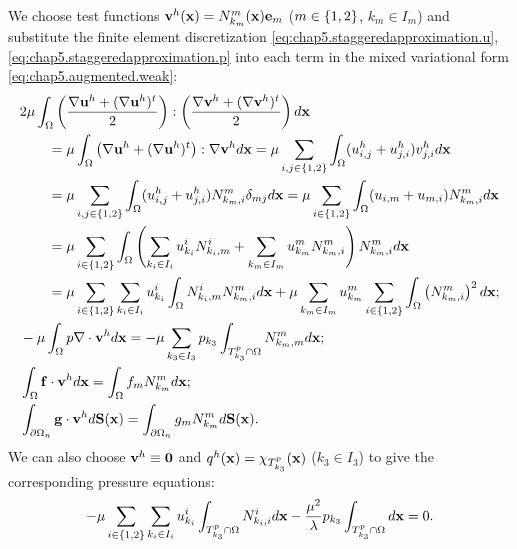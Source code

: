 We choose test functions $\mathbf{v}^h(\mathbf{x}) = N^m_{k_m}(\mathbf{x}) \mathbf{e}_m$ ($m \in \left\lbrace 1,2 \right\rbrace$, $k_m \in I_m$) and substitute the finite element discretization \eqref{eq:chap5.staggeredapproximation.u}, \eqref{eq:chap5.staggeredapproximation.p} into each term in the mixed variational form \eqref{eq:chap5.augmented.weak}:
\begin{subequations} \label{eq:chap5.integrations}
\begin{align}
& 2 \mu \int_{\Omega} \left( \frac{\nabla \mathbf{u}^h + (\nabla \mathbf{u}^h)^t}{2} \right) : \left( \frac{\nabla \mathbf{v}^h + (\nabla \mathbf{v}^h)^t}{2} \right) d\mathbf{x} \\
& \qquad = \mu \int_{\Omega} \left( \nabla \mathbf{u}^h + (\nabla \mathbf{u}^h)^t \right) : \nabla \mathbf{v}^h d\mathbf{x} = \mu \sum_{i,j \in \left\lbrace 1,2 \right\rbrace} \int_{\Omega} (u^h_{i,j} + u^h_{j,i}) v^h_{j,i} d\mathbf{x} \\
& \qquad = \mu \sum_{i,j \in \left\lbrace 1,2 \right\rbrace} \int_{\Omega} (u^h_{i,j} + u^h_{j,i}) N^m_{k_m,i} \delta_{mj} d\mathbf{x} = \mu \sum_{i \in \left\lbrace 1,2 \right\rbrace} \int_{\Omega} (u_{i,m}+u_{m,i}) N^m_{k_m,i} d\mathbf{x} \\
& \qquad = \mu \sum_{i \in \left\lbrace 1,2 \right\rbrace} \int_{\Omega} \left( \sum_{k_i \in I_i} u^i_{k_i} N^i_{k_i,m} + \sum_{k_m \in I_m} u^m_{k_m} N^m_{k_m,i} \right) N^m_{k_m,i} d\mathbf{x} \\
& \qquad = \mu \sum_{i \in \left\lbrace 1,2 \right\rbrace} \sum_{k_i \in I_i} u^i_{k_i} \int_{\Omega} N^i_{k_i,m} N^m_{k_m,i} d\mathbf{x} + \mu \sum_{k_m \in I_m} u^m_{k_m} \sum_{i \in \left\lbrace 1,2 \right\rbrace} \int_{\Omega} \left( N^m_{k_m,i} \right)^2 d\mathbf{x}; \\
& -\mu \int_{\Omega} p \nabla \cdot \mathbf{v}^h d\mathbf{x} = -\mu \sum_{k_3 \in I_3} p_{k_3} \int_{T^p_{k_3} \cap \Omega} N^m_{k_m,m} d\mathbf{x}; \\
& \int_{\Omega} \mathbf{f} \cdot \mathbf{v}^h d\mathbf{x} = \int_{\Omega} f_m N^m_{k_m} d\mathbf{x}; \\
& \int_{\partial\Omega_n} \mathbf{g} \cdot \mathbf{v}^h d\mathbf{S}(\mathbf{x}) = \int_{\partial\Omega_n} g_m N^m_{k_m} d\mathbf{S}(\mathbf{x}).
\end{align}
\end{subequations}
We can also choose $\mathbf{v}^h \equiv \mathbf{0}$ and $q^h(\mathbf{x}) = \chi_{T^p_{k_3}}(\mathbf{x})$ ($k_3 \in I_3$) to give the corresponding pressure equations:
\begin{equation*}
-\mu \sum_{i \in \left\lbrace 1,2 \right\rbrace} \sum_{k_i \in I_i} u^i_{k_i} \int_{T^p_{k_3} \cap \Omega} N^i_{k_i,i} d\mathbf{x} - \frac{\mu^2}{\lambda} p_{k_3} \int_{T^p_{k_3} \cap \Omega} d\mathbf{x} = 0.
\end{equation*}

